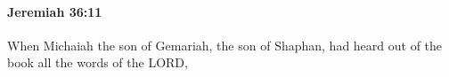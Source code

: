 
		\paragraph{Jeremiah 36:11} %
			\label{JEREMIAH-36-11}

			When Michaiah the son of Gemariah, the son of Shaphan, had heard out of the book all the words of the LORD,


